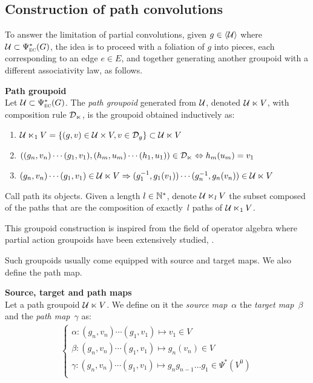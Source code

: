 \subsection{Construction of path convolutions}

To answer the limitation of partial convolutions, given $g \in \langle \mathcal{U} \rangle$ where $\mathcal{U} \subset \Psi_{\operatorname{\textsc{ec}}}^*(G)$, the idea is to proceed with a foliation of $g$ into pieces, each corresponding to an edge $e \in E$, and together generating another groupoid with a different associativity law, as follows.

\begin{definition}\textbf{Path groupoid}\\
Let $\mathcal{U} \subset \Psi_{\operatorname{\textsc{ec}}}^*(G)$. The \emph{path groupoid} generated from $\mathcal{U}$, denoted $\mathcal{U} \ltimes V$, with composition rule $\mathcal{D}_{\ltimes}$, is the groupoid obtained inductively as:
\begin{enumerate}
  \item $\mathcal{U} \ltimes_1 V = \{(g,v) \in \mathcal{U} \times V, v \in \mathcal{D}_g \} \subset \mathcal{U} \ltimes V$
  \item $((g_n,v_n) \cdots (g_1,v_1) , (h_m,u_m) \cdots (h_1,u_1)) \in \mathcal{D}_{\ltimes} \Leftrightarrow h_m(u_m) = v_1$
  \item $(g_n,v_n) \cdots (g_1,v_1) \in \mathcal{U} \ltimes V \Rightarrow (g_1^{-1}, g_1(v_1)) \cdots (g_n^{-1}, g_n(v_n)) \in \mathcal{U} \ltimes V$
\end{enumerate}
Call path its objects. Given a length $l \in \mathbb{N}^*$, denote $\mathcal{U} \ltimes_l V$ the subset composed of the paths that are the composition of exactly~$l$ paths of $\mathcal{U} \ltimes_1 V$.
\end{definition}

\begin{remark}
This groupoid construction is inspired from the field of operator algebra where partial action groupoids have been extensively studied, \eg \cite{nica1994groupoid,exel1998partial,li2016partial}.
\end{remark}

Such groupoids usually come equipped with source and target maps. We also define the path map.

\begin{definition}\textbf{Source, target and path maps}\\
Let a path groupoid $\mathcal{U} \ltimes V$. We define on it the \emph{source map}~$\alpha$ the \emph{target map}~$\beta$ and the \emph{path map}~$\gamma$ as:
\begin{gather*}
\begin{cases}
  \alpha: (g_n,v_n) \cdots (g_1,v_1) \mapsto v_1 \in V\\
  \beta: (g_n,v_n) \cdots (g_1,v_1) \mapsto g_n(v_n) \in V\\
  \gamma: (g_n,v_n) \cdots (g_1,v_1) \mapsto g_ng_{n-1}\ldots g_1 \in \Psi^*(V^0)\\
\end{cases}
\end{gather*}
\end{definition}

